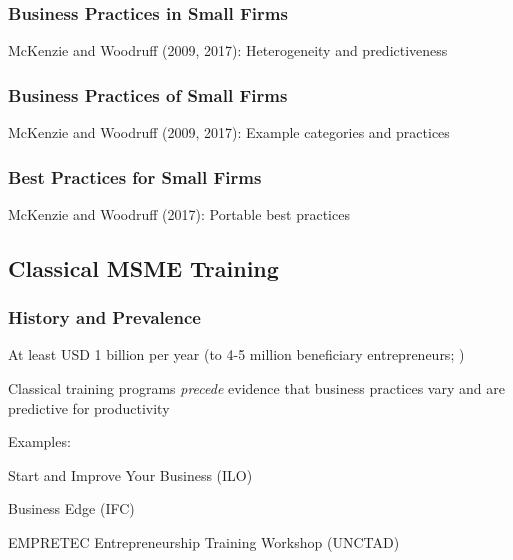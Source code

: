 \documentclass[hideothersubsections, usenames,dvipsnames,11pt]{beamer}
\newenvironment{itemize_3pt}{\itemize\addtolength{\itemsep}{3pt}}{\enditemize}
\begin{document}

\begin{frame}
\frametitle{Business Practices in Small Firms}
	\begin{itemize_3pt}
	\item McKenzie and Woodruff (2009, 2017): Heterogeneity and predictiveness \citep{McKenzie2009, McKenzie2017}
	\vspace{0.1in}
	\end{itemize_3pt}
\end{frame}

\begin{frame}
\frametitle{Business Practices of Small Firms}
	\begin{itemize_3pt}
	\item McKenzie and Woodruff (2009, 2017): Example categories and practices \citep{McKenzie2009, McKenzie2017}
	\vspace{0.1in}
	\end{itemize_3pt}
\end{frame}


\begin{frame}
\frametitle{Best Practices for Small Firms}
	\begin{itemize_3pt}
	\item McKenzie and Woodruff (2017): Portable best practices \citep{McKenzie2017}
	\vspace{0.1in}
	\end{itemize_3pt}
\end{frame}


\subsection{Classical MSME Training}


\begin{frame}
\frametitle{History and Prevalence}
	\begin{itemize_3pt}
		\item At least \textcolor{bdf}{USD 1 billion per year} (to 4-5 million beneficiary entrepreneurs; \citet{McKenzie2020})
		\item Classical training programs \emph{precede} evidence that business practices vary and are predictive for productivity
		\item Examples:
		\begin{itemize_3pt}
			\item Start and Improve Your Business (ILO)
			\item Business Edge (IFC)
			\item EMPRETEC Entrepreneurship Training Workshop (UNCTAD)
		\end{itemize_3pt} 
	\end{itemize_3pt}
\end{frame}
\end{document}
